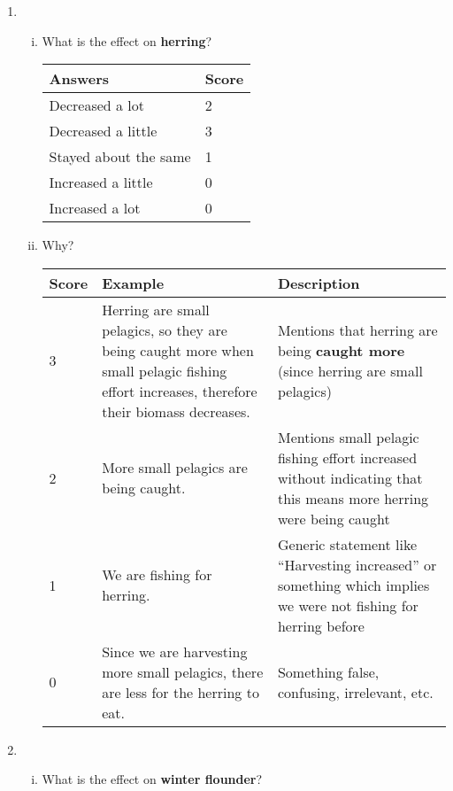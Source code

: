 {\setlength{\itemsep}{2em}
\begin{enumerate}


\item 
\begin{enumerate}[i.]
\item What is the effect on \textbf{herring}? 

{\small
{}
\begin{tabular}{| l | l |} \hline
\rowcolor{cyan!35} \textbf{Answers} & \textbf{Score} \\ \hline
Decreased a lot & 2 \\ 
Decreased a little & 3 \\ 
Stayed about the same & 1 \\ 
Increased a little & 0 \\
Increased a lot & 0 \\
\hline
\end{tabular}
}

\item Why?

{\small
{}
\begin{tabular}{| l | p{5.25cm} | p{5.7cm} |} \hline
\rowcolor{cyan!35} \textbf{Score} & \textbf{Example} & \textbf{Description} \\ \hline
3 & Herring are small pelagics, so they are being caught more when small pelagic fishing effort increases, therefore their biomass decreases. & Mentions that herring are being \textbf{caught more} (since herring are small pelagics) \\ 
2 & More small pelagics are being caught. & Mentions small pelagic fishing effort increased without indicating that this means more herring were being caught \\ 
1 & We are fishing for herring. & Generic statement like ``Harvesting increased'' or something which implies we were not fishing for herring before \\ 
0 & Since we are harvesting more small pelagics, there are less for the herring to eat. & Something false, confusing, irrelevant, etc. \\
\hline
\end{tabular}
}

\end{enumerate}

\clearpage

\item 
\begin{enumerate}[i.]
\item What is the effect on \textbf{winter flounder}?


\end{enumerate}
\end{enumerate}}
